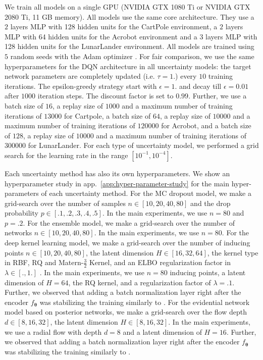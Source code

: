 We train all models on a single GPU (NVIDIA GTX 1080 Ti or NVIDIA GTX 2080 Ti, 11 GB memory). All models use the same core architecture. They use a $2$ layers MLP with 128 hidden units for the CartPole environment, a $2$ layers MLP with 64 hidden units for the Acrobot environment and a $3$ layers MLP with 128 hidden units for the LunarLander environment. All models are trained using $5$ random seeds with the Adam optimizer \cite{Adam}. For fair comparison, we use the same hyperparameters for the DQN architecture in all uncertainty models: the target network parameters are completely updated (i.e. $\tau=1.$) every $10$ training iterations. The epsilon-greedy strategy start with $\epsilon=1.$ and decay till $\epsilon=0.01$ after $1000$ iteration steps. The discount factor is set to $0.99$. Further, we use a batch size of $16$, a replay size of $1000$ and a maximum number of training iterations of $13000$ for Cartpole, a batch size of $64$, a replay size of $10000$ and a maximum number of training iterations of $120000$ for Acrobot, and a batch size of $128$, a replay size of $10000$ and a maximum number of training iterations of $300000$ for LunarLander. For each type of uncertainty model, we performed a grid search for the learning rate in the range $[10^{-1}, 10^{-4}]$. 

Each uncertainty method has also its own hyperparameters. We show an hyperparameter study in app.~\ref{app:hyper-parameter-study} for the main hyper-parameters of each uncertainty method. For the MC dropout model, we make a grid-search over the number of samples $n \in [10, 20, 40, 80]$ and the drop probability $p \in [.1, .2, .3, .4, .5]$. In the main experiments, we use $n=80$ and $p=.2$. For the ensemble model, we make a grid-search over the number of networks $n \in [10, 20, 40, 80]$. In the main experiments, we use $n=80$. For the deep kernel learning model, we make a grid-search over the number of inducing points $n \in [10, 20, 40, 80]$, the latent dimension $H \in [16, 32, 64]$, the kernel type in RBF, RQ and Matern-$\frac{3}{2}$ Kernel, and an ELBO regularization factor in $\lambda \in [., 1.]$ . In the main experiments, we use $n=80$ inducing points, a latent dimension of $H=64$, the RQ kernel, and a regularization factor of $\lambda=.1$. Further, we observed that adding a batch normalization layer right after the encoder $f_{\bm{\theta}}$ was stabilizing the training similarly to \citet{charpentier2020}. For the evidential network model based on posterior networks, we make a grid-search over the flow depth $d \in [8, 16, 32]$, the latent dimension $H \in [8, 16, 32]$. In the main experiments, we use a radial flow with depth $d=8$ and a latent dimension of $H=16$. Further, we observed that adding a batch normalization layer right after the encoder $f_{\bm{\theta}}$ was stabilizing the training similarly to \citet{charpentier2020}.


